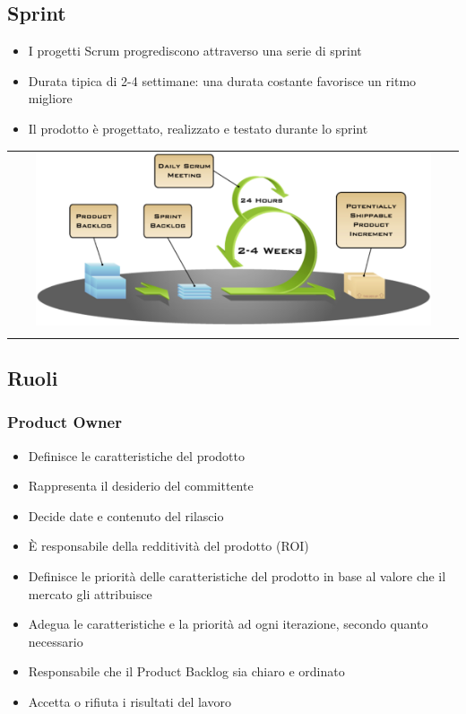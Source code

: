 \subsection{Sprint}
\begin{itemize}
    \item I progetti Scrum progrediscono attraverso una serie di sprint
    \item Durata tipica di 2-4 settimane: una durata costante favorisce un ritmo migliore
    \item Il prodotto è progettato, realizzato e testato durante lo sprint
\end{itemize}
\begin{center}
    \begin{tabular}{c}
        \\ \includegraphics[width=0.9\textwidth]{images/Scrum1.png} \\ \\
    \end{tabular}
\end{center}

\subsection{Ruoli}

\subsubsection{Product Owner}
\begin{itemize}
    \item Definisce le caratteristiche del prodotto
    \item Rappresenta il desiderio del committente
    \item Decide date e contenuto del rilascio
    \item È responsabile della redditività del prodotto (ROI)
    \item Definisce le priorità delle caratteristiche del prodotto in base al valore che il mercato gli attribuisce
    \item Adegua le caratteristiche e la priorità ad ogni iterazione, secondo quanto necessario
    \item Responsabile che il Product Backlog sia chiaro e ordinato
    \item Accetta o rifiuta i risultati del lavoro
\end{itemize}

